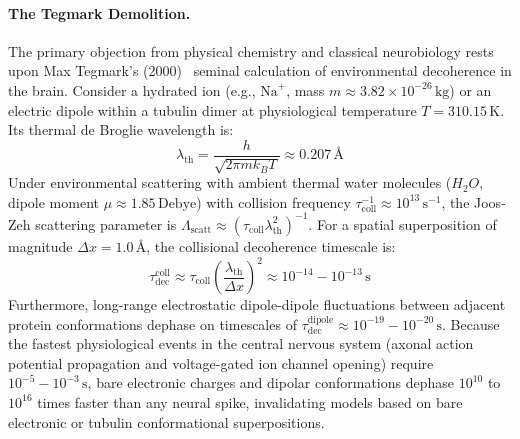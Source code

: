 \documentclass[10pt,twocolumn,3p]{article}
\begin{document}
\paragraph{The Tegmark Demolition.}
The primary objection from physical chemistry and classical neurobiology rests upon Max Tegmark's (2000)~\cite{tegmark2000} seminal calculation of environmental decoherence in the brain. Consider a hydrated ion (e.g., $\text{Na}^+$, mass $m \approx 3.82 \times 10^{-26}\,\text{kg}$) or an electric dipole within a tubulin dimer at physiological temperature $T = 310.15\,\text{K}$. Its thermal de Broglie wavelength is:
\begin{equation}
    \lambda_{\text{th}} = \frac{h}{\sqrt{2\pi m k_B T}} \approx 0.207\,\text{\AA}
\end{equation}
Under environmental scattering with ambient thermal water molecules ($H_2O$, dipole moment $\mu \approx 1.85\,\text{Debye}$) with collision frequency $\tau_{\text{coll}}^{-1} \approx 10^{13}\,\text{s}^{-1}$, the Joos-Zeh scattering parameter is $\Lambda_{\text{scatt}} \approx (\tau_{\text{coll}} \lambda_{\text{th}}^2)^{-1}$. For a spatial superposition of magnitude $\Delta x = 1.0\,\text{\AA}$, the collisional decoherence timescale is:
\begin{equation}
    \tau_{\text{dec}}^{\text{coll}} \approx \tau_{\text{coll}} \left( \frac{\lambda_{\text{th}}}{\Delta x} \right)^2 \approx 10^{-14} - 10^{-13}\,\text{s}
\end{equation}
Furthermore, long-range electrostatic dipole-dipole fluctuations between adjacent protein conformations dephase on timescales of $\tau_{\text{dec}}^{\text{dipole}} \approx 10^{-19} - 10^{-20}\,\text{s}$. Because the fastest physiological events in the central nervous system (axonal action potential propagation and voltage-gated ion channel opening) require $10^{-5} - 10^{-3}\,\text{s}$, bare electronic charges and dipolar conformations dephase $10^{10}$ to $10^{16}$ times faster than any neural spike, invalidating models based on bare electronic or tubulin conformational superpositions.
\end{document}
